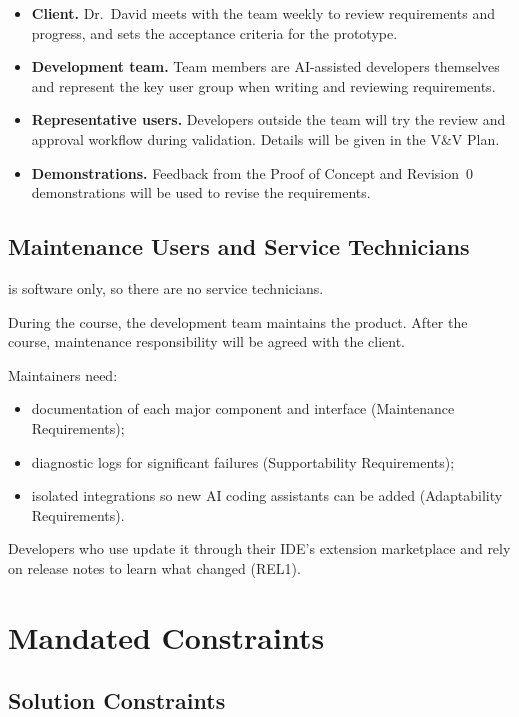 \documentclass[12pt]{article}
\begin{document}
\begin{itemize}
  \item \textbf{Client.} Dr.~David meets with the team weekly to review
  requirements and progress, and sets the acceptance criteria for the
  prototype.
  \item \textbf{Development team.} Team members are AI-assisted developers
  themselves and represent the key user group when writing and reviewing
  requirements.
  \item \textbf{Representative users.} Developers outside the team will try
  the review and approval workflow during validation. Details will be given in
  the V\&V Plan.
  \item \textbf{Demonstrations.} Feedback from the Proof of Concept and
  Revision~0 demonstrations will be used to revise the requirements.
\end{itemize}

\subsection{Maintenance Users and Service Technicians}

\progname{} is software only, so there are no service technicians.

During the course, the development team maintains the product. After the
course, maintenance responsibility will be agreed with the client.

Maintainers need:
\begin{itemize}
  \item documentation of each major component and interface
  (Maintenance Requirements);
  \item diagnostic logs for significant failures (Supportability
  Requirements);
  \item isolated integrations so new AI coding assistants can be added
  (Adaptability Requirements).
\end{itemize}

Developers who use \progname{} update it through their IDE's extension
marketplace and rely on release notes to learn what changed (REL1).

\section{Mandated Constraints}
\subsection{Solution Constraints}
\end{document}
